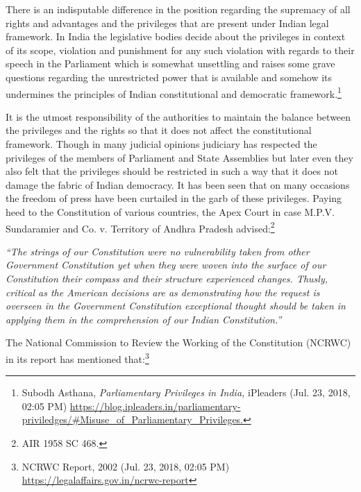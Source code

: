 \begin{multicols}{2}

\noi
There is an indisputable difference in the position regarding the supremacy of all rights and
advantages and the privileges that are present under Indian legal framework. In India the
legislative bodies decide about the privileges in context of its scope, violation and
punishment for any such violation with regards to their speech in the Parliament which is
somewhat unsettling and raises some grave questions regarding the unrestricted power that is
available and somehow its undermines the principles of Indian constitutional and democratic
framework.\footnote{Subodh Asthana, \textit{Parliamentary Privileges in India,} iPleaders (Jul. 23, 2018, 02:05 PM)
 \url{https://blog.ipleaders.in/parliamentary-priviledges/#Misuse_of_Parliamentary_Privileges.}}

\noi
It is the utmost responsibility of the authorities to maintain the balance between the privileges
and the rights so that it does not affect the constitutional framework. Though in many judicial
opinions judiciary has respected the privileges of the members of Parliament and State
Assemblies but later even they also felt that the privileges should be restricted in such a way
that it does not damage the fabric of Indian democracy. It has been seen that on many
occasions the freedom of press have been curtailed in the garb of these privileges. Paying
heed to the Constitution of various countries, the Apex Court in case M.P.V. Sundaramier
and Co. v. Territory of Andhra Pradesh advised:\footnote{AIR 1958 SC 468.}

\vspace{-.4cm}

\noi
\begin{quoting}
\textit{“The strings of our Constitution were no vulnerability taken from other Government
Constitution yet when they were woven into the surface of our Constitution their
compass and their structure experienced changes. Thusly, critical as the American
decisions are as demonstrating how the request is overseen in the Government
Constitution exceptional thought should be taken in applying them in the
comprehension of our Indian Constitution.”}
\end{quoting}

\vspace{-.4cm}

\noi
The National Commission to Review the Working of the Constitution (NCRWC) in its report
has mentioned that:\footnote{NCRWC Report, 2002 (Jul. 23, 2018, 02:05 PM) \url{https://legalaffairs.gov.in/ncrwc-report}}


\end{multicols}

